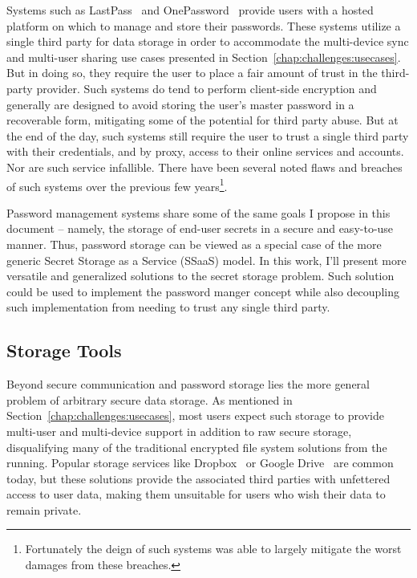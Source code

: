 Systems such as LastPass~\cite{lastpass} and
OnePassword~\cite{onepassword} provide users with a hosted platform on
which to manage and store their passwords. These systems utilize a
single third party for data storage in order to accommodate the
multi-device sync and multi-user sharing use cases presented in
Section~\ref{chap:challenges:usecases}. But in doing so, they require
the user to place a fair amount of trust in the third-party
provider. Such systems do tend to perform client-side encryption and
generally are designed to avoid storing the user's master password in
a recoverable form, mitigating some of the potential for third party
abuse. But at the end of the day, such systems still require the user
to trust a single third party with their credentials, and by proxy,
access to their online services and accounts. Nor are such service
infallible. There have been several noted flaws and breaches of such
systems over the previous few years\footnote{Fortunately the deign of
  such systems was able to largely mitigate the worst damages from
  these breaches.}\cite{blackhat-lastpass, changedmy-lastpass,
  lastpass-blog-breach}.

Password management systems share some of the same goals I propose in
this document -- namely, the storage of end-user secrets in a secure
and easy-to-use manner. Thus, password storage can be viewed as a
special case of the more generic Secret Storage as a Service (SSaaS)
model. In this work, I'll present more versatile and generalized
solutions to the secret storage problem. Such solution could be used
to implement the password manger concept while also decoupling such
implementation from needing to trust any single third party.

\subsection{Storage Tools}

Beyond secure communication and password storage lies the more general
problem of arbitrary secure data storage. As mentioned in
Section~\ref{chap:challenges:usecases}, most users expect such storage
to provide multi-user and multi-device support in addition to raw
secure storage, disqualifying many of the traditional encrypted file
system solutions from the running. Popular storage services like
Dropbox~\cite{dropbox} or Google Drive~\cite{google-drive} are common
today, but these solutions provide the associated third parties with
unfettered access to user data, making them unsuitable for users who
wish their data to remain private.

